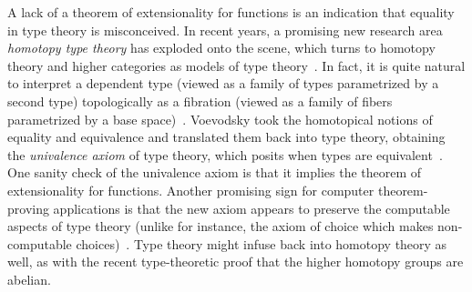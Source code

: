 \documentclass{llncs}
\begin{document}
A lack of a theorem of extensionality for functions is an indication
that equality in type theory is misconceived.  In recent years, a
promising new research area {\it homotopy type theory} has exploded
onto the scene, which turns to homotopy theory and higher categories
as models of type theory~\cite{htt}.  In fact, it is quite natural to
interpret a dependent type (viewed as a family of types parametrized
by a second type) topologically as a fibration (viewed as a family of
fibers parametrized by a base space)~\cite{AW09}. Voevodsky took the
homotopical notions of equality and equivalence and translated them
back into type theory, obtaining the {\it univalence axiom} of type
theory, which posits when types are equivalent~\cite{VV11}.  One
sanity check of the univalence axiom is that it implies the theorem of
extensionality for functions.  Another promising sign for computer
theorem-proving applications is that the new axiom appears to preserve
the computable aspects of type theory (unlike for instance, the axiom
of choice which makes non-computable choices)~\cite{LH11}.  Type
theory might infuse back into homotopy theory as well, as with the
recent type-theoretic proof that the higher homotopy groups are
abelian.







\newpage
\bigskip
\noindent
\end{document}
